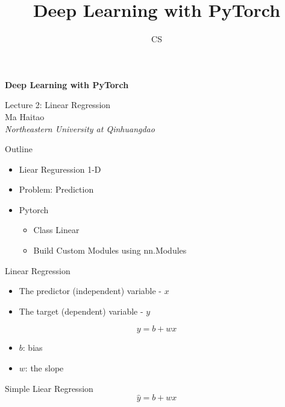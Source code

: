 \documentclass[14 pt]{beamer}
\author[mht]{CS}
\title[Deep Learning with PyTorch]{Deep Learning with PyTorch}
\institute{Northeastern University at Qinhuangdao}
\let\olditem\item
\renewcommand{\item}{\olditem\vspace{4pt}}
\newcommand{\comment}[1]{\textcolor{comment}{\footnotesize{#1}\normalsize}} %
\newcommand{\Comment}[1]{\textcolor{Comment}{\footnotesize{#1}\normalsize}} %
\newcommand{\COMMENT}[1]{\textcolor{COMMENT}{\footnotesize{#1}\normalsize}} %
\begin{document}
\begin{frame}[c]
\begin{center}
	\textcolor{normal text.fg!50!Comment}{\textbf{\Large{Deep Learning with PyTorch}}}
	\vspace{4em}

    \COMMENT{\large{Lecture 2: Linear Regression}} \\
\vspace{4em}
    \Comment{{Ma Haitao}} \\
\comment{\textit{Northeastern University at Qinhuangdao}}\\
\end{center}
\end{frame}

\begin{frame}{Outline}
  \begin{itemize}
  \item Liear Reguression 1-D
  \item Problem: Prediction
  \item Pytorch
    \begin{itemize}
    \item Class Linear
    \item Build Custom Modules using nn.Modules
    \end{itemize}
  \end{itemize}
\end{frame}

\begin{frame}{Linear Regression}
  \begin{itemize}
  \item The predictor (independent) variable - $x$
  \item The target (dependent) variable - $y$
  \end{itemize}
  \begin{equation}
    y = b + wx
  \end{equation}
  \begin{itemize}
  \item $b$: bias
  \item $w$: the slope
  \end{itemize}
\end{frame}

\begin{frame}{Simple Liear Regression}
  \begin{equation}
    \hat{y} = b + wx
  \end{equation}
\end{frame}
\end{document}
